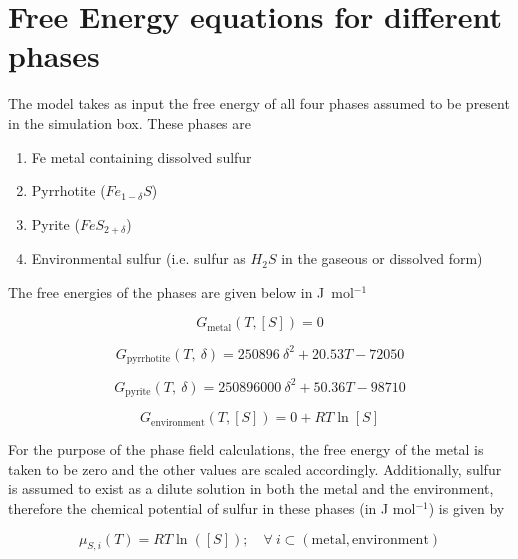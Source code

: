 \documentclass{article}
\begin{document}
\renewcommand{\arraystretch}{1.75}


\section{Free Energy equations for different phases}

The model takes as input the free energy of all four phases assumed to be present in the simulation box. These phases are

\begin{enumerate}
\item Fe metal containing dissolved sulfur
\item Pyrrhotite ($Fe_{1-\delta}S$)
\item Pyrite ($FeS_{2+\delta}$)
\item Environmental sulfur (i.e. sulfur as $H_2S$ in the gaseous or dissolved form)
\end{enumerate}

The free energies of the phases are given below in J\ mol$^{-1}$

\begin{equation}
  G_{\mathrm{metal}}(T,[S]) = 0
\label{g_met}
\end{equation}

\begin{equation}
  G_{\mathrm{pyrrhotite}}(T,\ \delta) = 250896 \ \delta^2 + 20.53T - 72050
\label{g_pht}
\end{equation}

\begin{equation}
  G_{\mathrm{pyrite}}(T,\ \delta) = 250896000 \ \delta^2 + 50.36T - 98710
\label{g_pyr}
\end{equation}

\begin{equation}
  G_{\mathrm{environment}}(T,[S]) = 0 + RT\ln[S]
\label{g_env}
\end{equation}


For the purpose of the phase field calculations, the free energy of the metal is taken to be zero and the other values are scaled accordingly. Additionally, sulfur is assumed to exist as a dilute solution in both the metal and the environment, therefore the chemical potential of sulfur in these phases (in J mol$^{-1}$) is given by

\begin{equation*}
  \mu_{S,i}(T) = RT\ln([S]); \quad \forall\ i \subset (\mathrm{metal,environment})
\end{equation*}
\end{document}
